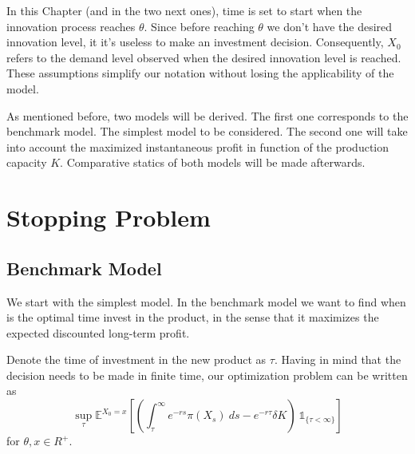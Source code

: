 In this Chapter (and in the two next ones), time is set to start when the innovation process reaches $\theta$. Since before reaching $\theta$ we don't have the desired innovation level, it it's useless to make an investment decision. Consequently, $X_0$ refers to the demand level observed when the desired innovation level is reached. These assumptions simplify our notation without losing the applicability of the model.

As mentioned before, two models will be derived. The first one corresponds to the benchmark model. The simplest model to be considered. The second one will take into account the maximized instantaneous profit in function of the production capacity $K$. Comparative statics of both models will be made afterwards.


\section{Stopping Problem}
\label{section:1_theory}



\subsection{Benchmark Model}
\label{subsec:1_bm}

We start with the simplest model. In the benchmark model we want to find when is the optimal time invest in the product, in the sense that it maximizes the expected discounted long-term profit.



Denote the time of investment in the new product as $\tau$. Having in mind that the decision needs to be made in finite time, our optimization problem can be written as 
\begin{equation}
\sup_\tau \mathds{E}^{X_0=x} \left[ \left( \int_\tau^\infty e^{-rs} \pi(X_s)\ ds - e^{-r \tau} \delta K \right) \ \mathds{1}_{\{\tau<\infty\}} \right]
\label{eq:probz}
\end{equation}
for $\theta, x\in R^+$.

